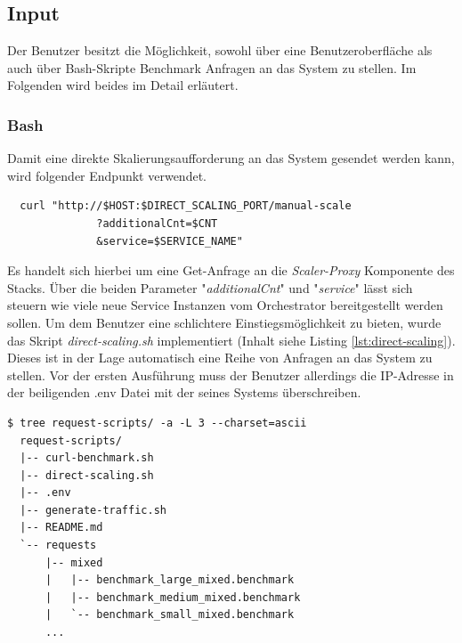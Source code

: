 \subsection{Input \checkmark}

Der Benutzer besitzt die Möglichkeit, sowohl über eine Benutzeroberfläche als auch über Bash-Skripte Benchmark Anfragen an das System zu stellen. Im Folgenden wird beides im Detail erläutert.

\subsubsection{Bash \checkmark}
Damit eine direkte Skalierungsaufforderung an das System gesendet werden kann, wird folgender Endpunkt verwendet.

\begin{verbatim}
  curl "http://$HOST:$DIRECT_SCALING_PORT/manual-scale
              ?additionalCnt=$CNT
              &service=$SERVICE_NAME"
\end{verbatim}

Es handelt sich hierbei um eine Get-Anfrage an die \emph{Scaler-Proxy} Komponente des Stacks. Über die beiden Parameter "\emph{additionalCnt}" und "\emph{service}" lässt sich steuern wie viele neue Service Instanzen vom Orchestrator bereitgestellt werden sollen. Um dem Benutzer eine schlichtere Einstiegsmöglichkeit zu bieten, wurde das Skript \emph{direct-scaling.sh} implementiert (Inhalt siehe Listing \ref{lst:direct-scaling}). Dieses ist in der Lage automatisch eine Reihe von Anfragen an das System zu stellen. Vor der ersten Ausführung muss der Benutzer allerdings die IP-Adresse in der beiligenden .env Datei mit der seines Systems überschreiben.

\label{verb:scriptStruct}
\begin{lstlisting}[caption={request-script-structure},style=bashStyle]
  $ tree request-scripts/ -a -L 3 --charset=ascii
  request-scripts/
  |-- curl-benchmark.sh
  |-- direct-scaling.sh
  |-- .env
  |-- generate-traffic.sh
  |-- README.md
  `-- requests
      |-- mixed
      |   |-- benchmark_large_mixed.benchmark
      |   |-- benchmark_medium_mixed.benchmark
      |   `-- benchmark_small_mixed.benchmark
      ...
\end{lstlisting}

